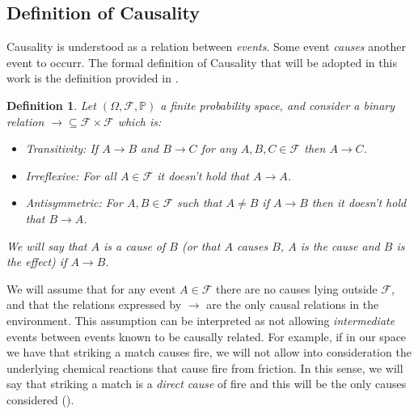 \documentclass[11pt]{article}
\theoremstyle{plain}
\newtheorem{defi}[teo]{Definition}
\begin{document}
	\subsection{Definition of Causality}
	Causality is understood as a relation between \textit{events}. Some event \textit{causes} another event to occurr. The formal definition of Causality that will be adopted in this work is the definition provided in \cite{spirtes2000causation}.
	\begin{defi}{\label{causal_relation}}
	Let $(\Omega, \mathcal{F}, \mathbb{P})$ a finite probability space, and consider a binary relation $\to \subseteq \mathcal{F} \times \mathcal{F}$ which is:
	\begin{itemize}
	\item Transitivity: If $A \to B$ and $B \to C$ for any $A, B, C \in \mathcal{F}$ then $A \to C$.
	\item Irreflexive: For all $A \in \mathcal{F}$ it doesn't hold that $A \to A$.
	\item Antisymmetric: For $A,B \in \mathcal{F}$ such that $A \neq B$ if $A \to B$ then it doesn't hold that $B \to A$.
	\end{itemize}
	We will say that $A$ is \textit{a cause} of $B$ (or that $A$ causes $B$, $A$ is the cause and $B$ is the effect) if $A \to B$.
	\end{defi}
	We will assume that for any event $A \in \mathcal{F}$ there are no causes lying outside $\mathcal{F}$, and that the relations expressed by $\to$ are the only causal relations in the environment. This assumption can be interpreted as not allowing \textit{intermediate} events between events known to be causally related. For example, if in our space we have that striking a match causes fire, we will not allow into consideration the underlying chemical reactions that cause fire from friction. In this sense, we will say that striking a match is a \textit{direct cause} of fire and this will be the only causes considered (\cite{spirtes2000causation}). 
\end{document}
